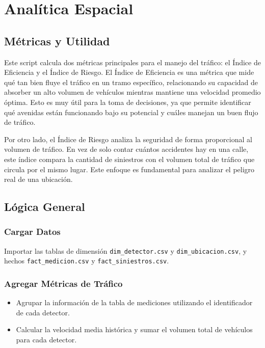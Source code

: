 \section{Analítica Espacial}

\subsection{Métricas y Utilidad}

Este script calcula dos métricas principales para el manejo del tráfico: el 
Índice de Eficiencia y el Índice de Riesgo. El Índice de Eficiencia es una 
métrica que mide qué tan bien fluye el tráfico en un tramo específico, 
relacionando su capacidad de absorber un alto volumen de vehículos mientras 
mantiene una velocidad promedio óptima. Esto es muy útil para la toma de 
decisiones, ya que permite identificar qué avenidas están funcionando 
bajo su potencial y cuáles manejan un buen flujo de tráfico.

Por otro lado, el Índice de Riesgo analiza la seguridad de forma 
proporcional al volumen de tr\'afico. 
En vez de solo contar cuántos accidentes hay en una calle, este índice compara 
la cantidad de siniestros con el volumen total de tráfico que circula por el 
mismo lugar. 
Este enfoque es fundamental para analizar el peligro real de una ubicaci\'on.

\subsection{Lógica General}

\subsubsection*{Cargar Datos}

Importar las tablas de dimensi\'on 
\texttt{dim\_detector.csv} y
\texttt{dim\_ubicacion.csv}, y hechos
\texttt{fact\_medicion.csv} y
\texttt{fact\_siniestros.csv}.

\subsubsection*{Agregar Métricas de Tráfico}
\begin{itemize}[noitemsep]
    \item Agrupar la información de la tabla de mediciones utilizando el 
        identificador de cada detector.
    \item Calcular la velocidad media histórica y sumar el volumen total de 
        vehículos para cada detector.
\end{itemize}

